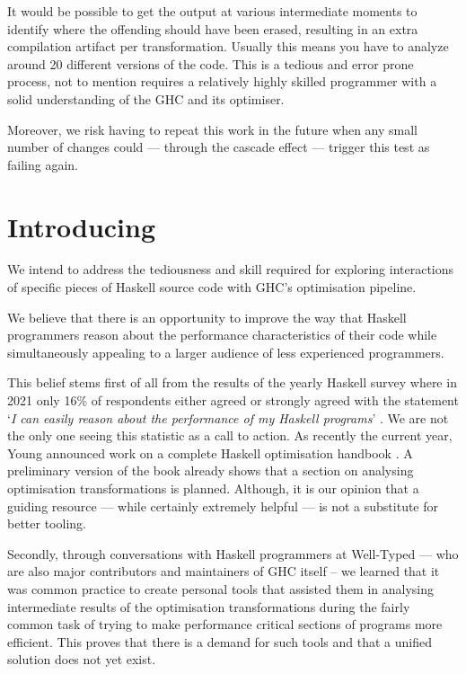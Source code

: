 It would be possible to get the output at various intermediate moments to identify where the 
offending  should have been erased, resulting in an extra compilation artifact per transformation.
Usually this means you have to analyze around 20 different versions of the code. 
This is a tedious and error prone process, not to mention requires a relatively highly skilled programmer 
with a solid understanding of the GHC and its optimiser. 

Moreover, we risk having to repeat this work in the future when any small number of changes
could --- through the cascade effect --- trigger this test as failing again.

\section{Introducing }

We intend to address the tediousness and skill required for exploring interactions of specific 
pieces of Haskell source code with GHC's optimisation pipeline.

We believe that there is an opportunity to improve the way that Haskell programmers reason about
the performance characteristics of their code while simultaneously appealing to a larger audience
of less experienced programmers.

This belief stems first of all from the results of the yearly
Haskell survey where in 2021 only 16\% of respondents either agreed or strongly agreed with the
statement `\textit{I can easily reason about the performance of my Haskell programs}' \cite{haskell_survey_2021}.
We are not the only one seeing this statistic as a call to action. As recently the current year,
Young announced work on a complete Haskell optimisation handbook \cite{optimisation_handbook}.
A preliminary version of the book already shows that a section on analysing optimisation transformations
is planned. Although, it is our opinion that a guiding resource --- while certainly extremely helpful ---
is not a substitute for better tooling.

Secondly, through conversations with Haskell programmers at Well-Typed --- who are also major contributors
and maintainers of GHC itself -- we learned that it was common practice to create personal tools that
assisted them in analysing intermediate results of the optimisation transformations during the fairly
common task of trying to make performance critical sections of programs more efficient. 
This proves that there is a demand for such tools and that a unified solution does not yet exist.






